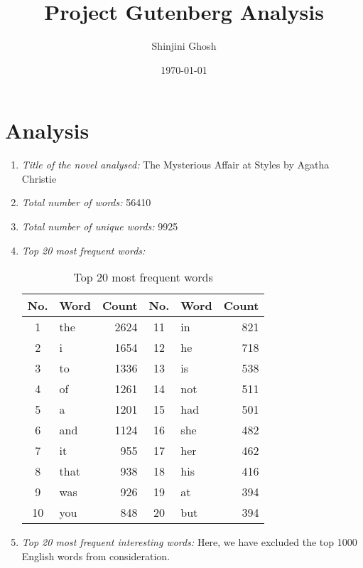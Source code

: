 \documentclass[12pt]{article}
\title{Project Gutenberg Analysis}
\author{Shinjini Ghosh}
\date{\today}
\begin{document}
\maketitle

\section*{Analysis}

\begin{enumerate}
  \item \textit{Title of the novel analysed:} The Mysterious Affair at Styles by Agatha Christie
  \item \textit{Total number of words:} 56410
  \item \textit{Total number of unique words:} 9925
  \item \textit{Top 20 most frequent words:}
        \begin{table}[h]
          \centering
          \begin{tabular}{c|l|r||c|l|r}
            \toprule
            No. & Word & Count & No. & Word & Count \\
            \midrule
            1 & the & 2624 & 11 & in & 821 \\
            2 & i & 1654 & 12 & he & 718 \\
            3 & to & 1336 & 13 & is & 538 \\
            4 & of & 1261 & 14 & not & 511 \\
            5 & a & 1201 & 15 & had & 501 \\
            6 & and & 1124 & 16 & she & 482 \\
            7 & it & 955 & 17 & her & 462 \\
            8 & that & 938 & 18 & his & 416 \\
            9 & was & 926 & 19 & at & 394 \\
            10 & you & 848 & 20 & but & 394 \\
            \bottomrule
          \end{tabular}
          \caption{Top 20 most frequent words}
          \label{top20}
        \end{table}
  \item \textit{Top 20 most frequent interesting words:} Here, we have excluded the top 1000 English words from consideration.
        \begin{table}[h]
          \centering
          \begin{tabular}{c|l|r||c|l|r}

\end{tabular}
\end{table}
\end{enumerate}
\end{document}
